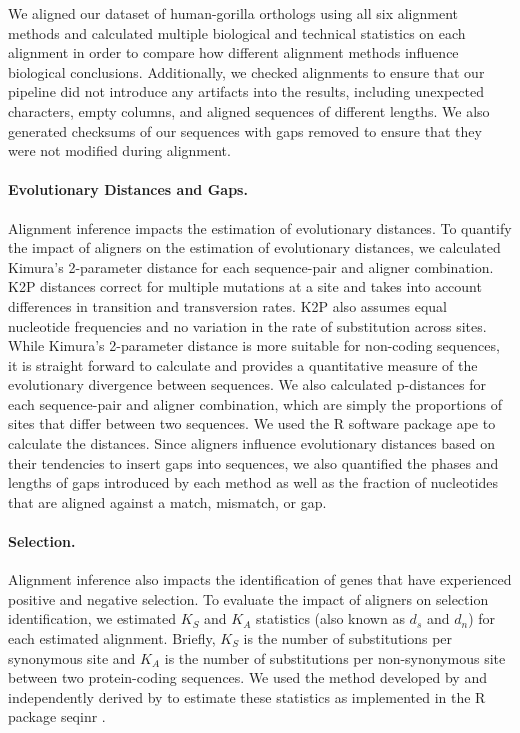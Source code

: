 \documentclass[12pt,letterpaper]{article}
\begin{document}
We aligned our dataset of human-gorilla orthologs using all six alignment methods and calculated multiple biological and technical statistics on each alignment in order to compare how different alignment methods influence biological conclusions.
%
Additionally, we checked alignments to ensure that our pipeline did not introduce any artifacts into the results, including unexpected characters, empty columns, and aligned sequences of different lengths. We also generated checksums of our sequences with gaps removed to ensure that they were not modified during alignment.

\paragraph{Evolutionary Distances and Gaps.}

Alignment inference impacts the estimation of evolutionary distances. To quantify the impact of aligners on the estimation of evolutionary distances, we calculated Kimura's 2-parameter distance \citep[K2P;][]{kimura1980simple} for each sequence-pair and aligner combination.  K2P distances correct for multiple mutations at a site and takes into account differences in transition and transversion rates. K2P also assumes equal nucleotide frequencies and no variation in the rate of substitution across sites. While Kimura's 2-parameter distance is more suitable for non-coding sequences, it is straight forward to calculate and provides a quantitative measure of the evolutionary divergence between sequences. We also calculated p-distances \citep{saitou1987neighbor} for each sequence-pair and aligner combination, which are simply the proportions of sites that differ between two sequences. We used the R software package ape \citep{paradis2019ape} to calculate the distances.
%
Since aligners influence evolutionary distances based on their tendencies to insert gaps into sequences, we also quantified the phases and lengths of gaps introduced by each method as well as the fraction of nucleotides that are aligned against a match, mismatch, or gap.

\paragraph{Selection.}
Alignment inference also impacts the identification of genes that have experienced positive and negative selection. To evaluate the impact of aligners on selection identification, we estimated $K_S$ and $K_A$ statistics (also known as $d_s$ and $d_n$) for each estimated alignment. Briefly, $K_S$ is the number of substitutions per synonymous site and $K_A$ is the number of substitutions per non-synonymous site between two protein-coding sequences. We used the method developed by \cite{ka_ks_li_1993} and independently derived by \cite{Pamilo1993} to estimate these statistics as implemented in the R package seqinr \citep{seqinr}. 
\end{document}
